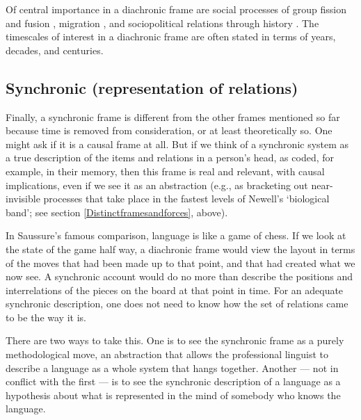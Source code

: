 Of central importance in a diachronic frame are social processes of 
group fission and fusion \citep{aureli_fission-fusion_2008}, migration \citep{manning_migration_2005}, and sociopolitical relations through history \citep{smith_inquiry_1776,marx_german_1947,runciman_theory_2009}. The timescales of interest in a 
diachronic frame are often stated in terms of years, decades, and 
centuries.



\subsection{Synchronic (representation of relations)}


Finally, a synchronic frame is different from the other frames mentioned 
so far because time is removed from consideration, or at least 
theoretically so. One might ask if it is a causal frame at all. But 
if we think of a synchronic system as a true description of the items 
and relations in a person's head, as coded, for example, in their 
memory, then this frame is real and relevant, with causal implications, 
even if we see it as an abstraction (e.g., as bracketing out 
near-invisible processes that take place in the fastest levels of 
Newell's \textquoteleft biological band'; see section \ref{Distinctframesandforces}, above). 



In Saussure's famous comparison, language is like a game of chess. If we 
look at the state of the game half way, a diachronic frame 
would view the layout in terms of the moves that had been made up 
to that point, and that had created what we now see. A 
synchronic account would do no more than describe the positions and 
interrelations of the pieces on the board at that point in time. For an 
adequate synchronic description, one does not need to know how the set 
of relations came to be the way it is. 



There are two ways to take this. One is to see the synchronic frame as a purely 
methodological move, an abstraction that allows the professional 
linguist to describe a language as a whole system that hangs together. 
Another --- not in conflict with the first --- is to see the 
synchronic description of a language as a hypothesis about what is 
represented in the mind of somebody who knows the language. 



